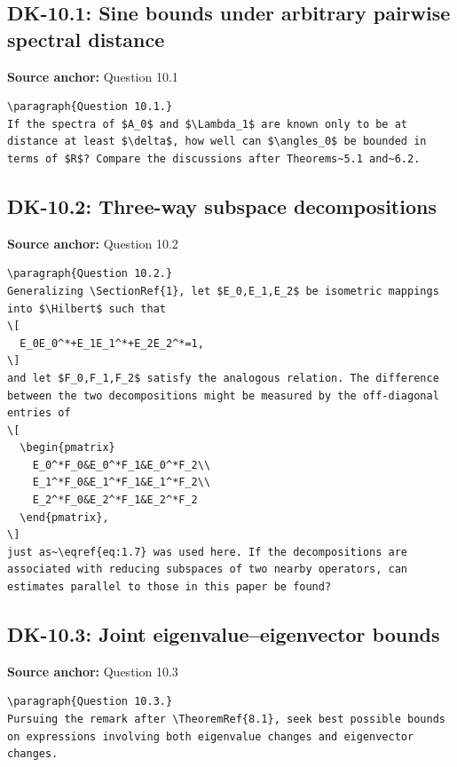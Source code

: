 \subsection*{DK-10.1: Sine bounds under arbitrary pairwise spectral distance}
\noindent\textbf{Source anchor:} Question 10.1\\
\begin{verbatim}
\paragraph{Question 10.1.}
If the spectra of $A_0$ and $\Lambda_1$ are known only to be at distance at least $\delta$, how well can $\angles_0$ be bounded in terms of $R$? Compare the discussions after Theorems~5.1 and~6.2.
\end{verbatim}

\subsection*{DK-10.2: Three-way subspace decompositions}
\noindent\textbf{Source anchor:} Question 10.2\\
\begin{verbatim}
\paragraph{Question 10.2.}
Generalizing \SectionRef{1}, let $E_0,E_1,E_2$ be isometric mappings into $\Hilbert$ such that
\[
  E_0E_0^*+E_1E_1^*+E_2E_2^*=1,
\]
and let $F_0,F_1,F_2$ satisfy the analogous relation. The difference between the two decompositions might be measured by the off-diagonal entries of
\[
  \begin{pmatrix}
    E_0^*F_0&E_0^*F_1&E_0^*F_2\\
    E_1^*F_0&E_1^*F_1&E_1^*F_2\\
    E_2^*F_0&E_2^*F_1&E_2^*F_2
  \end{pmatrix},
\]
just as~\eqref{eq:1.7} was used here. If the decompositions are associated with reducing subspaces of two nearby operators, can estimates parallel to those in this paper be found?
\end{verbatim}

\subsection*{DK-10.3: Joint eigenvalue–eigenvector bounds}
\noindent\textbf{Source anchor:} Question 10.3\\
\begin{verbatim}
\paragraph{Question 10.3.}
Pursuing the remark after \TheoremRef{8.1}, seek best possible bounds on expressions involving both eigenvalue changes and eigenvector changes.
\end{verbatim}

